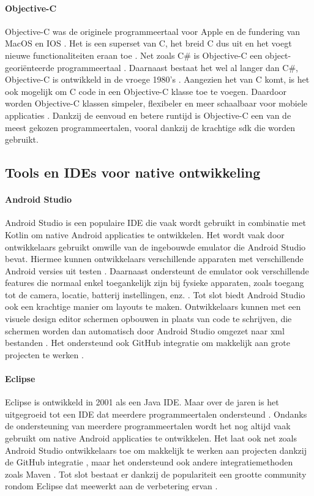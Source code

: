 \paragraph{Objective-C}
Objective-C was de originele programmeertaal voor Apple en de fundering van MacOS en 
IOS \autocite{Johns2023}. Het is een \gls{superset} van C, het breid C dus uit en het 
voegt nieuwe functionaliteiten eraan toe \autocite{Johns2023}. Net zoals C\# is Objective-C 
een object-georiënteerde programmeertaal \autocite{Pruciak2022}. Daarnaast bestaat 
het wel al langer dan C\#, Objective-C is ontwikkeld in de vroege 1980's \autocite{Pruciak2022}. 
Aangezien het van C komt, is het ook mogelijk om C code in een Objective-C klasse toe 
te voegen. Daardoor worden Objective-C klassen simpeler, flexibeler en meer schaalbaar 
voor mobiele applicaties \autocite{yuvraj2022}. Dankzij de eenvoud en betere runtijd is 
Objective-C een van de meest gekozen programmeertalen, vooral dankzij de krachtige \acrshort{sdk} 
die worden gebruikt.

\subsection{Tools en IDEs voor native ontwikkeling}
\paragraph{Android Studio}
Android Studio is een populaire IDE die vaak wordt gebruikt in combinatie met 
Kotlin om native Android applicaties te ontwikkelen. Het wordt vaak door ontwikkelaars 
gebruikt omwille van de ingebouwde \gls{emulator} die Android Studio bevat. Hiermee 
kunnen ontwikkelaars verschillende apparaten met verschillende Android versies uit 
testen \autocite{Medewar2022}. Daarnaast ondersteunt de emulator ook verschillende 
features die normaal enkel toegankelijk zijn bij fysieke apparaten, zoals toegang tot 
de camera, locatie, batterij instellingen, enz. \autocite{Okeke2022}. Tot slot biedt 
Android Studio ook een krachtige manier om layouts te maken. Ontwikkelaars kunnen met 
een visuele design editor schermen opbouwen in plaats van code te schrijven, die schermen 
worden dan automatisch door Android Studio omgezet naar xml bestanden \autocite{Medewar2022}. 
Het ondersteund ook GitHub integratie om makkelijk aan grote projecten te werken \autocite{Studio2023}.

\paragraph{Eclipse}
Eclipse is ontwikkeld in 2001 als een Java IDE. Maar over de jaren is het uitgegroeid 
tot een IDE dat meerdere programmeertalen ondersteund \autocite{Medewar2022}. Ondanks 
de ondersteuning van meerdere programmeertalen wordt het nog altijd vaak gebruikt om native 
Android applicaties te ontwikkelen. Het laat ook net zoals Android Studio ontwikkelaars toe 
om makkelijk te werken aan projecten dankzij de GitHub integratie \autocite{Okeke2022}, maar 
het ondersteund ook andere integratiemethoden zoals Maven \autocite{Medewar2022}. Tot slot 
bestaat er dankzij de populariteit een grootte community rondom Eclipse dat meewerkt aan de 
verbetering ervan \autocite{Medewar2022}.


